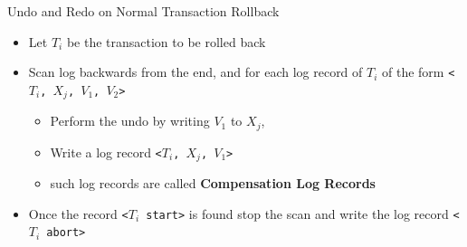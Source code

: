 \documentclass[aspectratio=169, xcolor=dvipsnames]{beamer}
\begin{document}
\begin{frame}{Undo and Redo on Normal Transaction Rollback}
    \begin{itemize}[<+->]
        \item Let $T_i$ be the transaction to be rolled back
        \item Scan log backwards from the end, and for each log record of $T_i$ of the form \texttt{<$T_i$, $X_j$, $V_1$, $V_2$>}
        \begin{itemize}
            \item[$\triangleright$] Perform the undo by writing $V_1$ to $X_j$,
            \item[$\triangleright$] Write a log record \texttt{<$T_i$, $X_j$, $V_1$>}
            \item[$\triangleright$] such log records are called \textbf{Compensation Log Records}
        \end{itemize}
        \item Once the record \texttt{<$T_i$ start>} is found stop the scan and write the log record \texttt{<$T_i$ abort>}
    \end{itemize}
\end{frame}
\end{document}
